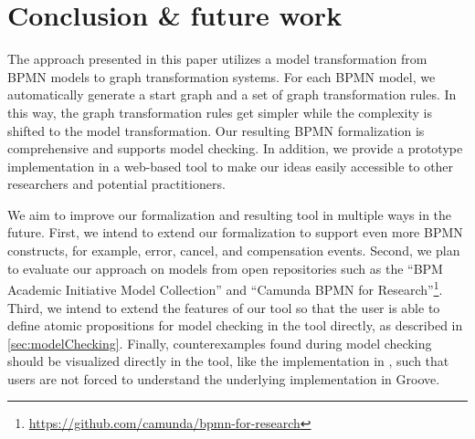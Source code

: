 \documentclass[submission, copyright, creativecommons]{eptcs}
\begin{document}
\section{Conclusion \& future work} \label{sec:conclusion}
The approach presented in this paper utilizes a model transformation from BPMN models to graph transformation systems. 
For each BPMN model, we automatically generate a start graph and a set of graph transformation rules.
In this way, the graph transformation rules get simpler while the complexity is shifted to the model transformation.
Our resulting BPMN formalization is comprehensive and supports model checking.
In addition, we provide a prototype implementation in a web-based tool to make our ideas easily accessible to other researchers and potential practitioners.

We aim to improve our formalization and resulting tool in multiple ways in the future.
First, we intend to extend our formalization to support even more BPMN constructs, for example, error, cancel, and compensation events.
Second, we plan to evaluate our approach on models from open repositories such as the \enquote{BPM Academic Initiative Model Collection} \cite{weskeModelCollectionBusiness2020} and  \enquote{Camunda BPMN for
Research}\footnote{\url{https://github.com/camunda/bpmn-for-research}}.
Third, we intend to extend the features of our tool so that the user is able to define atomic propositions for model checking in the tool directly, as described in \cref{sec:modelChecking}.
Finally, counterexamples found during model checking should be visualized directly in the tool, like the implementation in \cite{houhouFirstOrderLogicVerification2022}, such that users are not forced to understand the underlying implementation in Groove.


\end{document}
